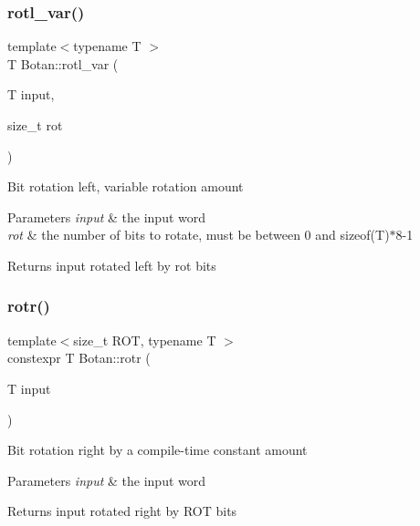 \subsubsection{\texorpdfstring{rotl\+\_\+var()}{rotl\_var()}}
{\footnotesize\ttfamily template$<$typename T $>$ \\
T Botan\+::rotl\+\_\+var (\begin{DoxyParamCaption}\item[{T}]{input,  }\item[{size\+\_\+t}]{rot }\end{DoxyParamCaption})\hspace{0.3cm}{\ttfamily [inline]}}

Bit rotation left, variable rotation amount 
\begin{DoxyParams}{Parameters}
{\em input} & the input word \\
\hline
{\em rot} & the number of bits to rotate, must be between 0 and sizeof(\+T)$\ast$8-\/1 \\
\hline
\end{DoxyParams}
\begin{DoxyReturn}{Returns}
input rotated left by rot bits 
\end{DoxyReturn}
\mbox{\label{namespace_botan_ada30f39e9838317878d9da1e095bdfe8}} 
\subsubsection{\texorpdfstring{rotr()}{rotr()}}
{\footnotesize\ttfamily template$<$size\+\_\+t R\+OT, typename T $>$ \\
constexpr T Botan\+::rotr (\begin{DoxyParamCaption}\item[{T}]{input }\end{DoxyParamCaption})\hspace{0.3cm}{\ttfamily [inline]}}

Bit rotation right by a compile-\/time constant amount 
\begin{DoxyParams}{Parameters}
{\em input} & the input word \\
\hline
\end{DoxyParams}
\begin{DoxyReturn}{Returns}
input rotated right by R\+OT bits 
\end{DoxyReturn}
\mbox{\label{namespace_botan_ae58d929c7e8f311bc908091212d969dd}} 
